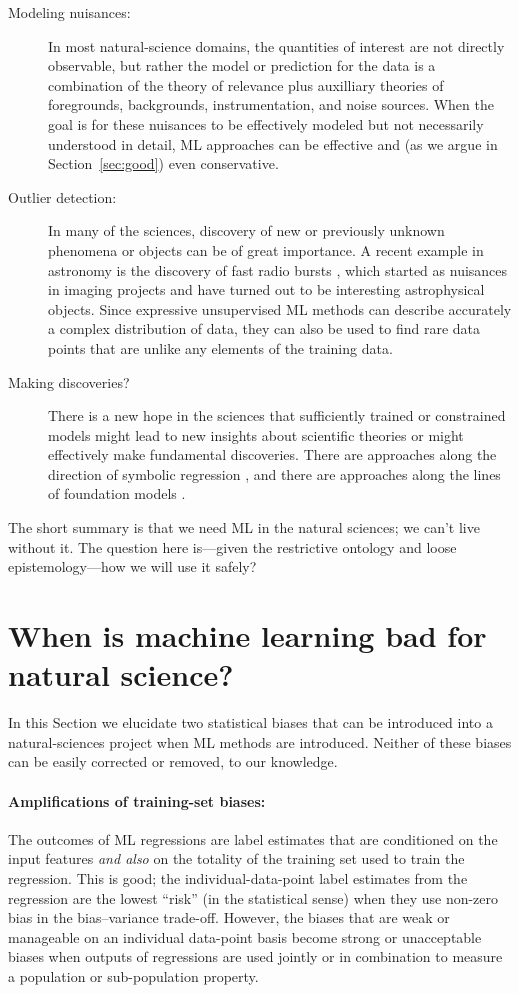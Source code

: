 \documentclass[11pt]{article}
\newcommand{\sectionname}{Section}
\begin{document}
\begin{description}
  \item[Modeling nuisances:] In most natural-science domains, the quantities of interest are not directly observable, but rather the model or prediction for the data is a combination of the theory of relevance plus auxilliary theories of foregrounds, backgrounds, instrumentation, and noise sources.
  When the goal is for these nuisances to be effectively modeled but not necessarily understood in detail, ML approaches can be effective and (as we argue in \sectionname~\ref{sec:good}) even conservative.
  \item[Outlier detection:] In many of the sciences, discovery of new or previously unknown phenomena or objects can be of great importance.
  A recent example in astronomy is the discovery of fast radio bursts \cite{grbs}, which started as nuisances in imaging projects and have turned out to be interesting astrophysical objects.
  Since expressive unsupervised ML methods can describe accurately a complex distribution of data, they can also be used to find rare data points that are unlike any elements of the training data.
  \item[Making discoveries?] There is a new hope in the sciences that sufficiently trained or constrained models might lead to new insights about scientific theories or might effectively make fundamental discoveries.
  There are approaches along the direction of symbolic regression \cite{symbolic1, symbolic2}, and there are approaches along the lines of foundation models \cite{foundation1, foundation2}.
\end{description}
The short summary is that we need ML in the natural sciences; we can't live without it.
The question here is---given the restrictive ontology and loose epistemology---how we will use it safely?

\section{When is machine learning bad for natural science?}\label{sec:bad}
In this \sectionname{} we elucidate two statistical biases that can be introduced into a natural-sciences project when ML methods are introduced.
Neither of these biases can be easily corrected or removed, to our knowledge.

\paragraph{Amplifications of training-set biases:}
The outcomes of ML regressions are label estimates that are conditioned on the input features \emph{and also} on the totality of the training set used to train the regression.
This is good; the individual-data-point label estimates from the regression are the lowest ``risk'' (in the statistical sense) when they use non-zero bias in the bias--variance trade-off.
However, the biases that are weak or manageable on an individual data-point basis become strong or unacceptable biases when outputs of regressions are used jointly or in combination to measure a population or sub-population property.
\end{document}

